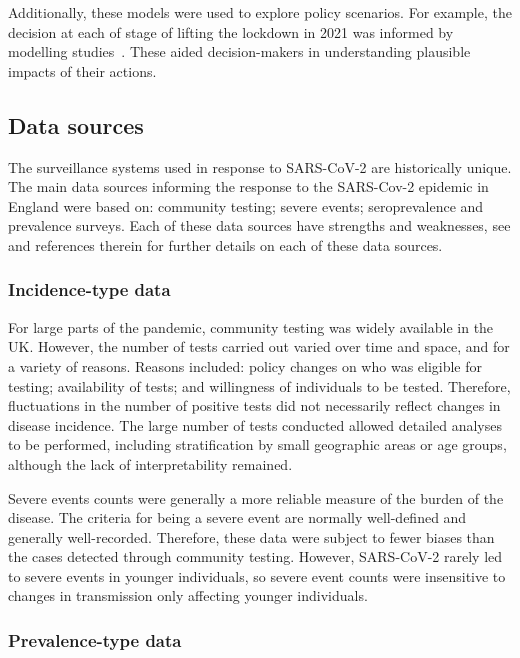 \documentclass[thesis.tex]{subfiles}
\begin{document}
Additionally, these models were used to explore policy scenarios.
For example, the decision at each of stage of lifting the lockdown in 2021 was informed by modelling studies~\autocite{sageEvidence}.
These aided decision-makers in understanding plausible impacts of their actions.

\subsection{Data sources} \label{intro:sec:data-for-estimating}

The surveillance systems used in response to SARS-CoV-2 are historically unique. 
The main data sources informing the response to the SARS-Cov-2 epidemic in England were based on: community testing; severe events; seroprevalence and prevalence surveys.
Each of these data sources have strengths and weaknesses, see \textcite{royalSocietyRnumber} and references therein for further details on each of these data sources.

\subsubsection{Incidence-type data}

For large parts of the pandemic, community testing was widely available in the UK.
However, the number of tests carried out varied over time and space, and for a variety of reasons.
Reasons included: policy changes on who was eligible for testing; availability of tests; and willingness of individuals to be tested.
Therefore, fluctuations in the number of positive tests did not necessarily reflect changes in disease incidence.
The large number of tests conducted allowed detailed analyses to be performed, including stratification by small geographic areas or age groups, although the lack of interpretability remained.

Severe events counts were generally a more reliable measure of the burden of the disease.
The criteria for being a severe event are normally well-defined and generally well-recorded.
Therefore, these data were subject to fewer biases than the cases detected through community testing.
However, SARS-CoV-2 rarely led to severe events in younger individuals, so severe event counts were insensitive to changes in transmission only affecting younger individuals.

\subsubsection{Prevalence-type data}
\end{document}
